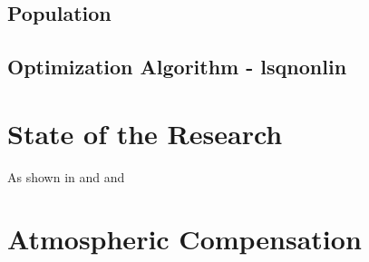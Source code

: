 \subsection{Population}
\subsection{Optimization Algorithm  - lsqnonlin}

\section{State of the Research}

As shown in \cite{Gerace}
and \cite{Mobley} and \cite{Lesser}

\section{Atmospheric Compensation}